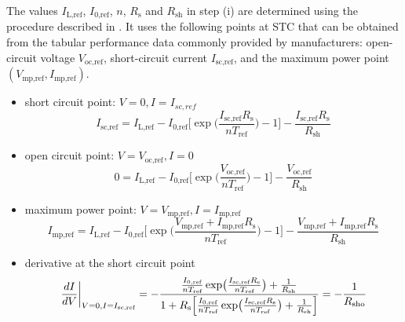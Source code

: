 The values \(I_{\text{L,ref}}\), \(I_{\text{0,ref}}\), \(n\), \(R_{\text{s}}\) and \(R_{\text{sh}}\)
in step (i) are determined using the procedure described in \cite[p. 1362f]{LoBrano}.
It uses the following points at STC that can be obtained from the tabular
performance data commonly provided by manufacturers: open-circuit voltage
\(V_{\text{oc,ref}}\), short-circuit current \(I_{\text{sc,ref}}\), and the maximum
power point \((V_{\text{mp,ref}}, I_{\text{mp,ref}})\).

\begin{itemize}
    \item short circuit point: \(V = 0, I = I_{sc,ref}\)
    \begin{equation}
        I_{\text{sc,ref}} = I_{\text{L,ref}} - I_{\text{0,ref}} \Biggl[ \exp\biggl(\frac{I_{\text{sc,ref}}R_{\text{s}}}{nT_{\text{ref}}}\biggr) - 1 \Biggr] - \frac{I_{\text{sc,ref}}R_{\text{s}}}{R_{\text{sh}}}
        \label{eq:IV_at_short_circuit_point_at_SRC}
    \end{equation}
    \item open circuit point: \(V = V_{\text{oc,ref}}, I = 0\)
    \begin{equation}
        0 = I_{\text{L,ref}} - I_{\text{0,ref}} \Biggl[ \exp\biggl(\frac{V_{\text{oc,ref}}}{nT_{\text{ref}}}\biggr) - 1 \Biggr] - \frac{V_{\text{oc,ref}}}{R_{\text{sh}}}
        \label{eq:IV_at_open_circuit_point_at_SRC}
    \end{equation}
    \item maximum power point: \(V = V_{\text{mp,ref}}, I = I_{\text{mp,ref}}\)
    \begin{equation}
        I_{\text{mp,ref}} = I_{\text{L,ref}} - I_{\text{0,ref}} \Biggl[ \exp\biggl(\frac{V_{\text{mp,ref}} + I_{\text{mp,ref}}R_{\text{s}}}{nT_{\text{ref}}}\biggr) - 1 \Biggr] - \frac{V_{\text{mp,ref}} + I_{\text{mp,ref}}R_{\text{s}}}{R_{\text{sh}}}
        \label{eq:IV_at_maximum_power_point_at_SRC}
    \end{equation}
    \item derivative at the short circuit point
    \begin{equation}
        \left.\frac{dI}{dV}\right|_{V = 0, I = I_{\text{sc,ref}}} = - \frac{\frac{I_{\text{0,ref}}}{nT_{\text{ref}}} \exp\bigl(\frac{I_{\text{sc,ref}}R_{\text{s}}}{nT_{\text{ref}}}\bigr) + \frac{1}{R_{\text{sh}}}}{1 + R_{\text{s}}\Bigl[ \frac{I_{\text{0,ref}}}{nT_{\text{ref}}} \exp\bigl(\frac{I_{\text{sc,ref}}R_{\text{s}}}{nT_{\text{ref}}}\bigr) + \frac{1}{R_{\text{sh}}} \Bigr]} = -\frac{1}{R_{\text{sho}}}
        \label{eq:IV_derivative_at_short_circuit_point_at_SRC}

\end{equation}
\end{itemize}
